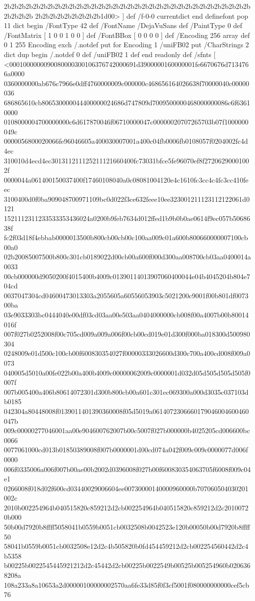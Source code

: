 2b2b2b2b2b2b2b2b2b2b2b2b2b2b2b2b2b2b2b2b2b2b2b2b2b2b2b2b2b2b2b2b2b2b2b2b2b2b
2b2b2b2b2b2b2b2b2b1d00>
] def
/f-0-0 currentdict end definefont pop
11 dict begin
/FontType 42 def
/FontName /DejaVuSans def
/PaintType 0 def
/FontMatrix [ 1 0 0 1 0 0 ] def
/FontBBox [ 0 0 0 0 ] def
/Encoding 256 array def
0 1 255 { Encoding exch /.notdef put } for
Encoding 1 /uniFB02 put
/CharStrings 2 dict dup begin
/.notdef 0 def
/uniFB02 1 def
end readonly def
/sfnts [
<0001000000090080000300106376742000691d3900000160000001fe6670676d7134766a0000
0360000000ab676c7966e0dff4760000009c000000c468656164026638f70000040c00000036
686865610cb806530000044400000024686d747809d7009500000468000000086c6f63610000
0108000004700000000c6d617870046f06710000047c00000020707265703b07f1000000049c
0000056800020066fe96046605a400030007001a400c04fb0006fb0108057f0204002fc4d4ec
310010d4ecd4ec301311211125211121660400fc73031bfce5fe96070ef8f27206290001002f
0000044a061400150037400f17460108040a0c08081004120e4c1610fc3cc4c4fc3cc410feec
3100400d0f0ba909048700971109bc0d022f3ce632feee10ee323001211123112122061d0121
1521112311233533353436024a0200b9feb7634d012ffed1b9b0b0ae0614f9ec057b5068638f
fc2f03d18f4ebbab0000013500b800cb00cb00c100aa009c01a600b800660000007100cb00a0
02b20085007500b800c301cb0189022d00cb00a600f000d300aa008700cb03aa0400014a0033
00cb000000d9050200f4015400b4009c01390114013907060400044e04b4045204b804e704cd
0037047304cd04600473013303a2055605a60556053903c5021200c9001f00b801df007300ba
03e9033303bc0444040e00df03cd03aa00e503aa0404000000cb008f00a4007b00b80014016f
007f027b0252008f00c705cd009a009a006f00cb00cd019e01d300f000ba018300d500980304
0248009e01d500c100cb00f600830354027f00000333026600d300c700a400cd008f009a0073
040005d5010a00fe022b00a400b4009c00000062009c0000001d032d05d505d505d505f0007f
007b005400a406b80614072301d300b800cb00a601c301ec069300a000d3035c037103db0185
042304a80448008f0139011401390360008f05d5019a0614072306660179046004600460047b
009c00000277046001aa00e904600762007b00c5007f027b000000b4025205cd006600bc0066
0077061000cd013b01850389008f007b0000001d00cd074a042f009c009c0000077d006f0000
006f0335006a006f007b00ae00b2002d0396008f027b00f600830354063705f6008f009c04e1
0266008f018d02f600cd03440029006604ee00730000140000960000b707060504030201002c
2010b002254964b040515820c859212d2cb002254964b040515820c859212d2c20100720b000
50b00d7920b8ffff5058041b0559b0051cb0032508b0042523e120b00050b00d7920b8ffff50
58041b0559b0051cb0032508e12d2c4b505820b0fd454459212d2cb002254560442d2c4b5358
b00225b0022545445921212d2c45442d2cb00225b0022549b00525b005254960b0206368208a
108a233a8a10653a2d00000100000002570aa6fe33d85f0f3cf5001f080000000000cef5cb76
